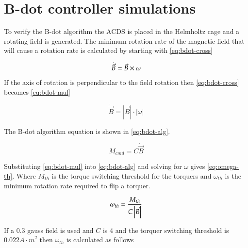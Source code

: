 \section{B-dot controller simulations}

To verify the B-dot algorithm the \ac{ACDS} is placed in the Helmholtz cage and a rotating field is generated. The minimum rotation rate of the magnetic field that will cause a rotation rate is calculated by starting with \cref{eq:bdot-cross}

\begin{equation}
    \dot{\vec{B}} = \vec{B} \times \omega
    \label{eq:bdot-cross}
\end{equation}

If the axis of rotation is perpendicular to the field rotation then \cref{eq:bdot-cross} becomes \cref{eq:bdot-mul}

\begin{equation}
    \dot{\vec{B}} = \left| \vec{B} \right| \cdot \left| \omega \right|
    \label{eq:bdot-mul}
\end{equation}

The B-dot algorithm equation is shown in \cref{eq:bdot-alg}.

\begin{equation}
    M_{cmd} = C \dot{\vec{B}} 
    \label{eq:bdot-alg}
\end{equation}

Substituting \cref{eq:bdot-mul} into \cref{eq:bdot-alg} and solving for $\omega$ gives \cref{eq:omega-th}. Where $M_{th}$ is the torque switching threshold for the torquers and $\omega_{th}$ is the minimum rotation rate required to flip a torquer.


\begin{equation}
    \omega _ {th} = {M _ {th} \over{ {C \left| \vec{B} \right|}}}
    \label{eq:omega-th}
\end{equation}

If a 0.3 gauss field is used and $C$ is 4 and the torquer switching threshold is $0.022 \unit{A \cdot m} ^2$ then $\omega_{th}$ is calculated as follows

